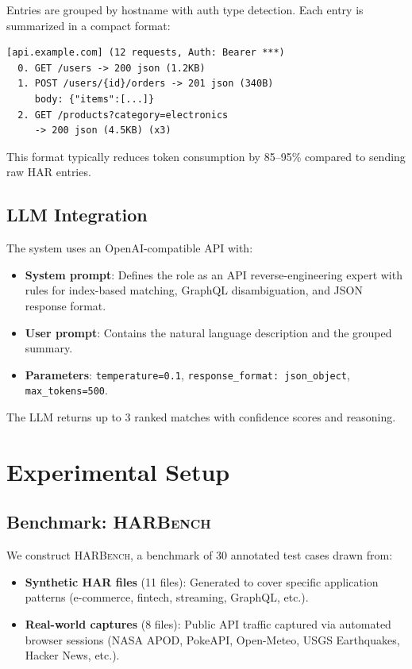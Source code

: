 \documentclass[10pt,twocolumn]{article}
\begin{document}
Entries are grouped by hostname with auth type detection. Each entry is summarized in a compact format:

\begin{lstlisting}
[api.example.com] (12 requests, Auth: Bearer ***)
  0. GET /users -> 200 json (1.2KB)
  1. POST /users/{id}/orders -> 201 json (340B)
     body: {"items":[...]}
  2. GET /products?category=electronics
     -> 200 json (4.5KB) (x3)
\end{lstlisting}

This format typically reduces token consumption by 85--95\% compared to sending raw HAR entries.

\subsection{LLM Integration}

The system uses an OpenAI-compatible API with:
\begin{itemize}[nosep]
  \item \textbf{System prompt}: Defines the role as an API reverse-engineering expert with rules for index-based matching, GraphQL disambiguation, and JSON response format.
  \item \textbf{User prompt}: Contains the natural language description and the grouped summary.
  \item \textbf{Parameters}: \texttt{temperature=0.1}, \texttt{response\_format: json\_object}, \texttt{max\_tokens=500}.
\end{itemize}

The LLM returns up to 3 ranked matches with confidence scores and reasoning.

\section{Experimental Setup}

\subsection{Benchmark: \textsc{HARBench}}

We construct \textsc{HARBench}, a benchmark of 30 annotated test cases drawn from:
\begin{itemize}[nosep]
  \item \textbf{Synthetic HAR files} (11 files): Generated to cover specific application patterns (e-commerce, fintech, streaming, GraphQL, etc.).
  \item \textbf{Real-world captures} (8 files): Public API traffic captured via automated browser sessions (NASA APOD, PokeAPI, Open-Meteo, USGS Earthquakes, Hacker News, etc.).
\end{itemize}
\end{document}
